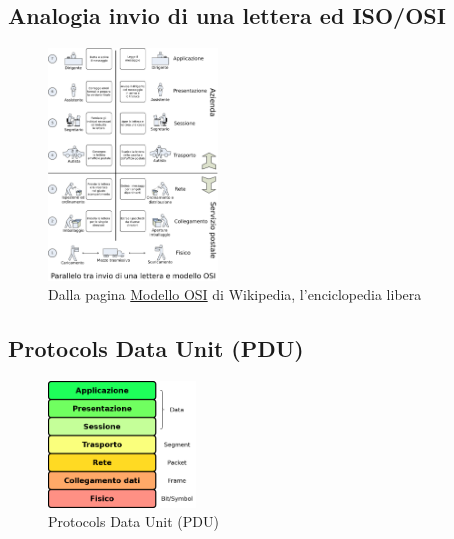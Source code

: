 \documentclass{beamer}
\begin{document}
\subsection*{Analogia invio di una lettera ed ISO/OSI}
\begin{frame}{\insertsection}{\insertsubsection}
\begin{figure}
\includegraphics[width=0.40\textwidth]{imgs/lettera-e-iso-osi.png}
\caption{Dalla pagina \href{https://it.wikipedia.org/wiki/Modello\_OSI}{Modello
OSI} di Wikipedia, l'enciclopedia libera}
\end{figure}
\end{frame}

\subsection*{Protocols Data Unit (PDU)}
\begin{frame}{\insertsection}{\insertsubsection}
\begin{figure}
\includegraphics[width=0.35\textwidth]{imgs/02-iso-osi-pdu.drawio.png}
\caption{Protocols Data Unit (PDU)}
\end{figure}
\end{frame}
\end{document}
